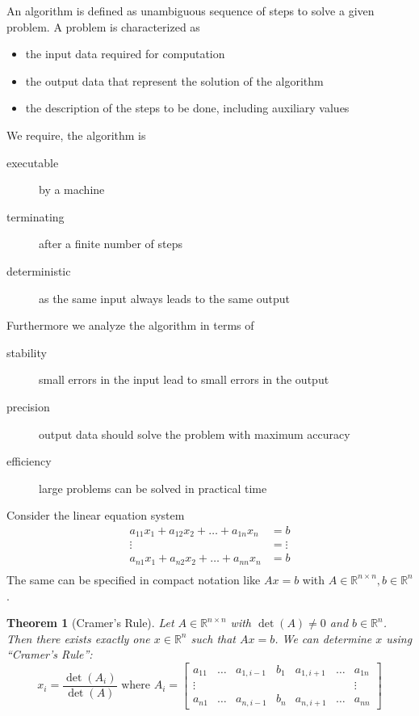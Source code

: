 \documentclass[a4paper]{article}
\newcounter{lecref}[section]
\numberwithin{lecref}{section}
\theoremstyle{break}
\newtheorem{thm}[lecref]{Theorem}
\begin{document}
An algorithm is defined as unambiguous sequence of steps to solve a given problem. A problem is characterized as
\begin{itemize}
  \item the input data required for computation
  \item the output data that represent the solution of the algorithm
  \item the description of the steps to be done, including auxiliary values
\end{itemize}
We require, the algorithm is
\begin{description}
  \item[executable] by a machine
  \item[terminating] after a finite number of steps
  \item[deterministic] as the same input always leads to the same output
\end{description}
Furthermore we analyze the algorithm in terms of
\begin{description}
  \item[stability] small errors in the input lead to small errors in the output
  \item[precision] output data should solve the problem with maximum accuracy
  \item[efficiency] large problems can be solved in practical time
\end{description}

Consider the linear equation system
\begin{align*}
  a_{11} x_1 + a_{12} x_2 + \dots + a_{1n} x_n &= b \\
  \vdots &= \vdots \\
  a_{n1} x_1 + a_{n2} x_2 + \dots + a_{nn} x_n &= b \\
\end{align*}
The same can be specified in compact notation like $Ax = b$ with $A \in \mathbb R^{n \times n}, b \in \mathbb R^n$.

\begin{thm}[Cramer's Rule]
  Let $A \in \mathbb R^{n \times n}$ with $\det(A) \neq 0$ and $b \in \mathbb R^n$.
  Then there exists exactly one $x \in \mathbb R^n$ such that $Ax = b$. We can determine $x$ using \enquote{Cramer's Rule}:
  \[
    x_i = \frac{\det(A_i)}{\det(A)} \text{ where }
    A_i = \begin{bmatrix}
      a_{11} & \dots & a_{1, i-1} & b_1 & a_{1,i+1} & \dots & a_{1n} \\
      \vdots &       &            &     &           &       & \vdots \\
      a_{n1} & \dots & a_{n,i-1}  & b_n & a_{n,i+1} & \dots & a_{nn}
    \end{bmatrix}
  \]
\end{thm}
\end{document}
